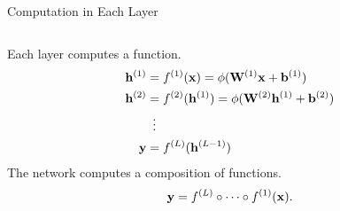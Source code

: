 \documentclass[11pt,handout,aspectratio=169]{beamer}
\begin{document}
\begin{frame}{Computation in Each Layer}
\medskip 

\begin{columns}
\begin{column}{0.75\linewidth}

Each layer computes a function.
\begin{align*}
          \mathbf{h}^{(1)} &= f^{(1)}(\mathbf{x}) = \phi(\mathbf{W}^{(1)} \mathbf{x} + \mathbf{b}^{(1)}) \\
          \mathbf{h}^{(2)} &= f^{(2)}(\mathbf{h}^{(1)}) = \phi(\mathbf{W}^{(2)} \mathbf{h}^{(1)} + \mathbf{b}^{(2)})\\
                       & \hspace{0.5em} \vdots \\
          \mathbf{y} &= f^{(L)}(\mathbf{h}^{(L-1)})
\end{align*}
\bigskip
\pause 
The network computes a composition of functions.\\[-7mm]
        \[ \mathbf{y} = f^{(L)} \circ \cdots \circ f^{(1)}(\mathbf{x}). \]

\bigskip


\end{column}
\end{columns}
\end{frame}
\end{document}
